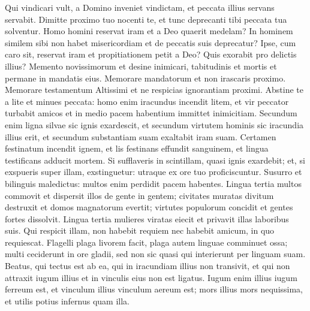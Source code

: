 \begin{biblechapter}
\begin{biblechapter}
\begin{biblechapter}
\begin{biblechapter}
\begin{biblechapter}
\begin{biblechapter}
\begin{biblechapter}
\begin{biblechapter}
\begin{biblechapter}
\begin{biblechapter}
\begin{biblechapter}
\begin{biblechapter}
\begin{biblechapter}
\begin{biblechapter}
\begin{biblechapter}
\begin{biblechapter}
\begin{biblechapter}
\begin{biblechapter}
\begin{biblechapter}
\begin{biblechapter}
\begin{biblechapter}
\begin{biblechapter}
\begin{biblechapter}
\begin{biblechapter}
\begin{biblechapter}
\begin{biblechapter}
\begin{biblechapter}
\begin{biblechapter}
\verse Qui vindicari vult, a Domino inveniet vindictam,
 et peccata illius servans servabit.
 \verse Dimitte proximo tuo nocenti te,
 et tunc deprecanti tibi peccata tua solventur.
 \verse Homo homini reservat iram
 et a Deo quaerit medelam?
 \verse In hominem similem sibi non habet misericordiam
 et de peccatis suis deprecatur?
 \verse Ipse, cum caro sit, reservat iram
 et propitiationem petit a Deo?
 Quis exorabit pro delictis illius?
 \verse Memento novissimorum et desine inimicari,
 \verse tabitudinis et mortis et permane in mandatis eius.
 \verse Memorare mandatorum et non irascaris proximo.
 \verse Memorare testamentum Altissimi
 et ne respicias ignorantiam proximi.
 \verse Abstine te a lite et minues peccata:
 \verse homo enim iracundus incendit litem,
 et vir peccator turbabit amicos
 et in medio pacem habentium immittet inimicitiam.
 \verse Secundum enim ligna silvae sic ignis exardescit,
 et secundum virtutem hominis sic iracundia illius erit,
 et secundum substantiam suam exaltabit iram suam.
 \verse Certamen festinatum incendit ignem,
 et lis festinans effundit sanguinem,
 et lingua testificans adducit mortem.
 \verse Si sufflaveris in scintillam, quasi ignis exardebit;
 et, si exspueris super illam, exstinguetur:
 utraque ex ore tuo proficiscuntur.
 \verse Susurro et bilinguis maledictus:
 multos enim perdidit pacem habentes.
 \verse Lingua tertia multos commovit
 et dispersit illos de gente in gentem;
 \verse civitates muratas divitum destruxit
 et domos magnatorum evertit;
 \verse virtutes populorum concidit
 et gentes fortes dissolvit.
 \verse Lingua tertia mulieres viratas eiecit
 et privavit illas laboribus suis.
 \verse Qui respicit illam, non habebit requiem
 nec habebit amicum, in quo requiescat.
 \verse Flagelli plaga livorem facit,
 plaga autem linguae comminuet ossa;
 \verse multi ceciderunt in ore gladii,
 sed non sic quasi qui interierunt per linguam suam.
 \verse Beatus, qui tectus est ab ea,
 qui in iracundiam illius non transivit,
 et qui non attraxit iugum illius
 et in vinculis eius non est ligatus.
 \verse Iugum enim illius iugum ferreum est,
 et vinculum illius vinculum aereum est;
 \verse mors illius mors nequissima,
 et utilis potius infernus quam illa.

\end{biblechapter}
\end{biblechapter}
\end{biblechapter}
\end{biblechapter}
\end{biblechapter}
\end{biblechapter}
\end{biblechapter}
\end{biblechapter}
\end{biblechapter}
\end{biblechapter}
\end{biblechapter}
\end{biblechapter}
\end{biblechapter}
\end{biblechapter}
\end{biblechapter}
\end{biblechapter}
\end{biblechapter}
\end{biblechapter}
\end{biblechapter}
\end{biblechapter}
\end{biblechapter}
\end{biblechapter}
\end{biblechapter}
\end{biblechapter}
\end{biblechapter}
\end{biblechapter}
\end{biblechapter}
\end{biblechapter}
